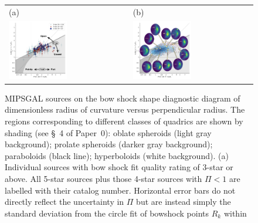 \documentclass[useAMS, usenatbib, a4paper]{mnras}
\begin{document}
\begin{figure}
  \centering
  \setlength\tabcolsep{0pt}
  \begin{tabular}{ll}
    (a) & (b) \\
    \includegraphics[width=0.5\textwidth]
    {figs/mipsgal-Rc-R90-zoom-annotated}
        & \includegraphics[width=0.5\textwidth]
          {figs/mipsgal-Rc-R90-thumbnails} 
  \end{tabular}
  \vspace*{-\baselineskip}
  \caption[]{MIPSGAL sources on the bow shock shape diagnostic diagram
    of dimensionless radius of curvature versus perpendicular radius.
    The regions corresponding to different classes of quadrics are
    shown by shading (see \S~4 of Paper~0): oblate spheroids (light
    gray background); prolate spheroids (darker gray background);
    paraboloids (black line); hyperboloids (white background).
    (a) Individual sources with bow shock fit quality rating of 3-star
    or above.  All 5-star sources plus those 4-star sources with
    \(\Pi < 1\) are labelled with their \cite{Kobulnicky:2016a} catalog
    number.  Horizontal error bars do not directly reflect the
    uncertainty in \(\Pi\) but are instead simply the standard deviation
    from the circle fit of bowshock points \(R_k\) within
}
\end{figure}
\end{document}

